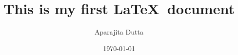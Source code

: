 \documentclass[12pt]{article}
\begin{document}
	\title{ This is my first \LaTeX \ document}
	\author{Aparajita Dutta}
	\date{\today}
\end{document}
